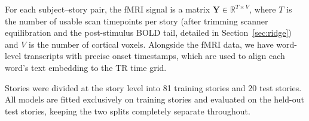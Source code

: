 For each subject--story pair, the fMRI signal is a matrix $\bm{Y} \in \mathbb{R}^{T \times V}$, where $T$ is the number of usable scan timepoints per story (after trimming scanner equilibration and the post-stimulus BOLD tail, detailed in Section~\ref{sec:ridge}) and $V$ is the number of cortical voxels.  Alongside the fMRI data, we have word-level transcripts with precise onset timestamps, which are used to align each word's text embedding to the TR time grid.

Stories were divided at the story level into 81 training stories and 20 test stories.  All models are fitted exclusively on training stories and evaluated on the held-out test stories, keeping the two splits completely separate throughout.
